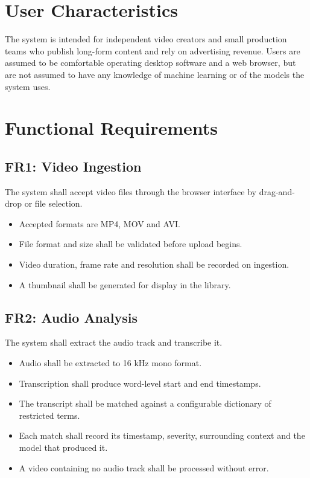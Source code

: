 \documentclass[12pt,a4paper,twoside]{report}
\begin{document}
\section{User Characteristics}

The system is intended for independent video creators and small production teams who publish long-form content and rely on advertising revenue. Users are assumed to be comfortable operating desktop software and a web browser, but are not assumed to have any knowledge of machine learning or of the models the system uses.

\section{Functional Requirements}

\subsection{FR1: Video Ingestion}

The system shall accept video files through the browser interface by drag-and-drop or file selection.

\begin{itemize}
\item Accepted formats are MP4, MOV and AVI.
\item File format and size shall be validated before upload begins.
\item Video duration, frame rate and resolution shall be recorded on ingestion.
\item A thumbnail shall be generated for display in the library.
\end{itemize}

\subsection{FR2: Audio Analysis}

The system shall extract the audio track and transcribe it.

\begin{itemize}
\item Audio shall be extracted to 16 kHz mono format.
\item Transcription shall produce word-level start and end timestamps.
\item The transcript shall be matched against a configurable dictionary of restricted terms.
\item Each match shall record its timestamp, severity, surrounding context and the model that produced it.
\item A video containing no audio track shall be processed without error.
\end{itemize}
\end{document}
